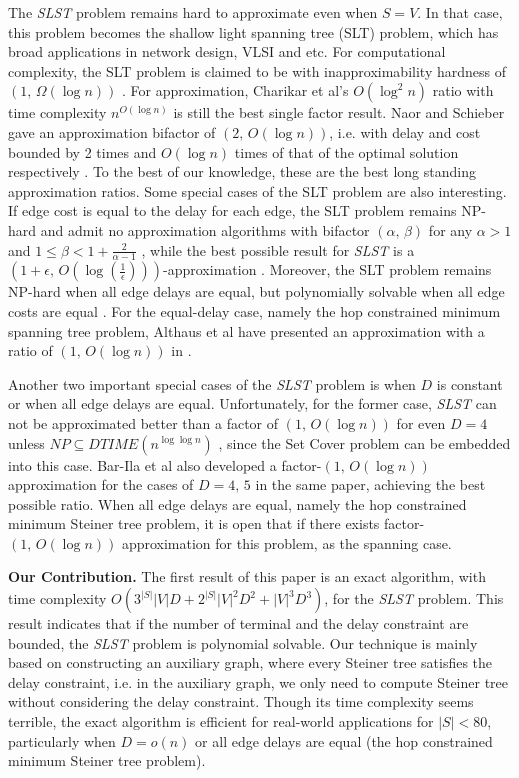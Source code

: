 \documentclass[english,runningheads,a4paper]{llncs}
\begin{document}
The \emph{SLST }problem remains hard to approximate even when $S=V$.
In that case, this problem becomes the shallow light spanning tree
(SLT) problem, which has broad applications in network design, VLSI
and etc. For computational complexity, the SLT problem is claimed
to be with inapproximability hardness of $(1,\,\Omega(\log n))$ \cite{naor1997improved}.
For approximation, Charikar et al's $O(\log^{2}n)$ ratio with time
complexity $n^{O(\log n)}$\cite{charikar1998approximation} is still
the best single factor result. Naor and Schieber gave an approximation
bifactor of $(2,\, O(\log n))$, i.e. with delay and cost bounded
by 2 times and $O(\log n)$ times of that of the optimal solution
respectively \cite{naor1997improved}. To the best of our knowledge,
these are the best long standing approximation ratios. Some special
cases of the SLT problem are also interesting. If edge cost is equal
to the delay for each edge, the SLT problem remains NP-hard and admit
no approximation algorithms with bifactor $(\alpha,\,\beta)$ for
any $\alpha>1$ and $1\leq\beta<1+\frac{2}{\alpha-1}$ \cite{khuller1995balancing},
while the best possible result for \emph{SLST} is a $(1+\epsilon,\, O(\log(\frac{1}{\epsilon})))$-approximation
\cite{elkin2011steiner}.  Moreover, the SLT problem remains NP-hard
when all edge delays are equal, but polynomially solvable when all
edge costs are equal \cite{salama1997delay}. For the equal-delay
case, namely the hop constrained minimum spanning tree problem, Althaus
et al have presented an approximation with a ratio of $(1,\, O(\log n))$
in \cite{althaus2005approximating}.

Another two important special cases of the \emph{SLST} problem is
when $D$ is constant or when all edge delays are equal. Unfortunately,
for the former case, \emph{SLST} can not be approximated better than
a factor of $(1,\, O(\log n))$ for even $D=4$ unless $NP\subseteq DTIME(n^{\log\log n})$
\cite{bar2001generalized}, since the Set Cover problem can be embedded
into this case. Bar-Ila et al also developed a factor-$(1,\, O(\log n))$
approximation for the cases of $D=4,\,5$ in the same paper, achieving
the best possible ratio. When all edge delays are equal, namely the
hop constrained minimum Steiner tree problem, it is open that if there
exists factor-$(1,\, O(\log n))$ approximation for this problem,
as the spanning case.

\textbf{Our Contribution. }The first result of this paper is an exact
algorithm, with time complexity $O(3^{|S|}|V|D+2^{|S|}|V|^{2}D^{2}+|V|^{3}D^{3})$,
for the \emph{SLST} problem. This result indicates that if the number
of terminal and the delay constraint are bounded, the \emph{SLST}
problem is polynomial solvable. Our technique is mainly based on constructing
an auxiliary graph, where every Steiner tree satisfies the delay constraint,
i.e. in the auxiliary graph, we only need to compute Steiner tree
without considering the delay constraint. Though its time complexity
seems terrible, the exact algorithm is efficient for real-world applications
for $|S|<80$, particularly when $D=o(n)$ or all edge delays are
equal (the hop constrained minimum Steiner tree problem).
\end{document}
